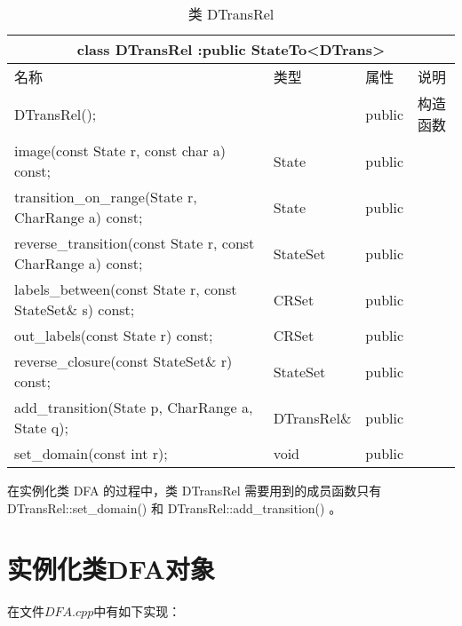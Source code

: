 \begin{table}[!htbp]
    \caption{类 DTransRel}
    \label{tab:Class-DTransRel}
    \centering
    \small%
    \setlength{\tabcolsep}{4pt}%
    \renewcommand{\arraystretch}{1.2}%
        \begin{tabular}{llll} %
        \toprule 
         \multicolumn{4}{c}{class DTransRel :public StateTo<DTrans>} \\
        \midrule
        名称& 类型 & 属性  &\mbox{说明} \\
        \midrule 
        DTransRel(); &  &  public & 构造函数 \\
        image(const State r, const char a) const; & State & public & \\
        transition\_on\_range(State r, CharRange a) const; & State & public & \\
        reverse\_transition(const State r, const CharRange a) const; & StateSet & public & \\
        labels\_between(const State r, const StateSet\& s) const; & CRSet & public & \\
        out\_labels(const State r) const; & CRSet & public & \\
        reverse\_closure(const StateSet\& r) const; & StateSet & public & \\
        add\_transition(State p, CharRange a, State q); & DTransRel\& & public & \\
        set\_domain(const int r); & void & public & \\
        \bottomrule 
    \end{tabular}
\end{table}

在实例化类 DFA 的过程中，类 DTransRel 需要用到的成员函数只有 DTransRel::set\_domain() 和 DTransRel::add\_transition() 。







\section{实例化类DFA对象}\label{sec:get_a_dfa}

在文件$DFA.cpp$中有如下实现：

